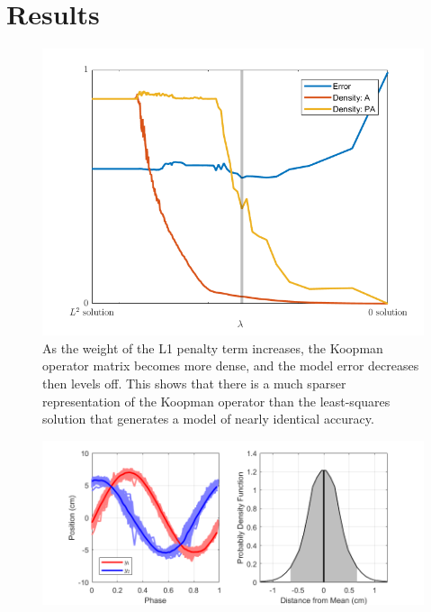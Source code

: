\section{Results}
\label{sec:results}

\begin{figure}
    \centering
    \includegraphics[width=\linewidth]{figures/lasso_ph.png}
    \caption{ As the weight of the L1 penalty term increases, the Koopman operator matrix becomes more dense, and the model error decreases then levels off. This shows that there is a much sparser representation of the Koopman operator than the least-squares solution that generates a model of nearly identical accuracy.}
    \label{fig:lasso}
\end{figure}

\begin{figure}
    \centering
    \includegraphics[width=\linewidth]{figures/noise_ph.png}
    \caption{}
    \label{fig:noise}
\end{figure}


